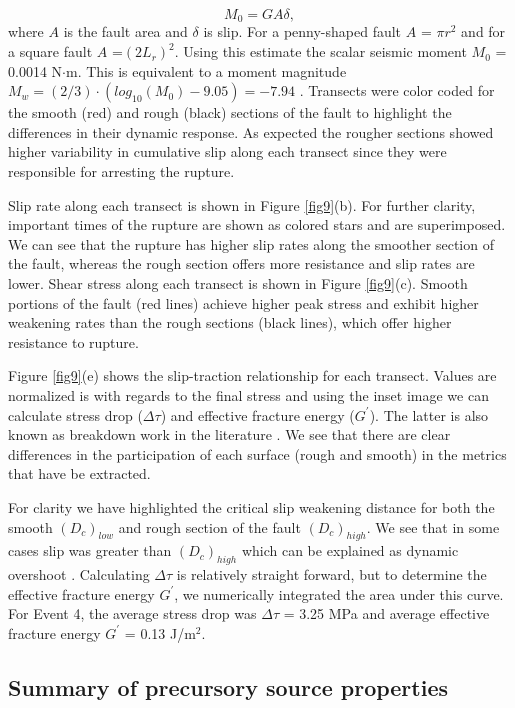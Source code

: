 \documentclass[preprint,1p, 10pt,authoryear]{elsarticle}
\begin{document}
\begin{equation}
M_{0} = G A \delta, 
\label{eq9}
\end{equation}
\noindent where $A$ is the fault area and $\delta$ is slip. For a penny-shaped fault $A$ = $\pi r^{2}$ and for a square fault $A$ =$(2L_{r})^{2}$. Using this estimate the scalar seismic moment $M_{0}$ = 0.0014 N$\cdot$m. This is equivalent to a moment magnitude $M_{w} = (2/3)\cdot(log_{10}(M_{0})-9.05) = -7.94$ \citep{Kanamori1975}.  Transects were color coded for the smooth (red) and rough (black) sections of the fault to highlight the differences in their dynamic response. As expected the rougher sections showed higher variability in cumulative slip along each transect since they were responsible for arresting the rupture.    

Slip rate along each transect is shown in Figure \ref{fig9}(b). For further clarity, important times of the rupture are shown as colored stars and are superimposed. We can see that the rupture has higher slip rates along the smoother section of the fault, whereas the rough section offers more resistance and slip rates are lower. Shear stress along each transect is shown in Figure \ref{fig9}(c). Smooth portions of the fault (red lines) achieve higher peak stress and exhibit higher weakening rates than the rough sections (black lines), which offer higher resistance to rupture.

Figure \ref{fig9}(e) shows the slip-traction relationship for each transect. Values are normalized is with regards to the final stress and using the inset image we can calculate stress drop ($\Delta\tau$) and effective fracture energy ($G^{'}$).  The latter is also known as breakdown work in the literature \citep[e.g.,][]{Tinti2005, Cocco2016}. We see that there are clear differences in the participation of each surface (rough and smooth) in the metrics that have be extracted. 

For clarity we have highlighted the critical slip weakening distance for both the smooth $(D_{c})_{low}$ and rough section of the fault $(D_{c})_{high}$. We see that in some cases slip was greater than $(D_{c})_{high}$ which can be explained as dynamic overshoot \citep{Madariaga1976}. Calculating $\Delta \tau$ is relatively straight forward, but to determine the effective fracture energy $G^{'}$, we numerically integrated the area under this curve. For Event 4, the average stress drop was $\Delta\tau$ = 3.25 MPa and average effective fracture energy $G^{'}$ = 0.13 J/m$^{2}$.  

\subsection{Summary of precursory source properties}
\end{document}
